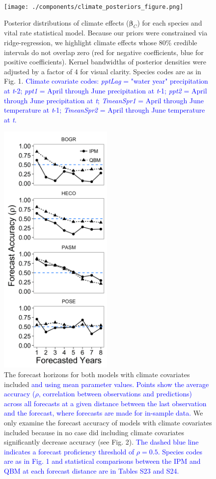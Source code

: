 \documentclass[12pt,]{article}
\begin{document}
\begin{figure}[!ht]
  \centering
      \texttt{[image: ./components/climate\_posteriors\_figure.png]}
  \caption{Posterior distributions of climate effects ($\boldsymbol{\beta}_C$) for each species and vital rate statistical model. Because our priors were constrained via ridge-regression, we highlight climate effects whose 80\% credible intervals do not overlap zero (red for negative coefficients, blue for positive coefficients). Kernel bandwidths of posterior densities were adjusted by a factor of 4 for visual clarity. Species codes are as in Fig. 1. \textcolor{blue}{Climate covariate codes: \emph{pptLag} = "water year" precipitation at \emph{t}-2; \emph{ppt1} = April through June precipitation at \emph{t}-1; \emph{ppt2} = April through June precipitation at \emph{t}; \emph{TmeanSpr1} = April through June temperature at \emph{t}-1; \emph{TmeanSpr2} = April through June temperature at \emph{t}.}}
\end{figure}

\newpage{}

\begin{figure}[!ht]
  \centering
      \includegraphics[height=5in]{./components/forecast_horizon.png}
  \caption{The forecast horizons for both models with climate covariates included \textcolor{blue}{and using mean parameter values. Points show the average accuracy ($\rho$, \textcolor{blue}{correlation between observations and predictions}) across all forecasts at a given distance between the last observation and the forecast, where forecasts are made for in-sample data.} We only examine the forecast accuracy of models with climate covariates included because in no case did including climate covariates significantly decrease accuracy (see Fig. 2). \textcolor{blue}{The dashed blue line indicates a forecast proficiency threshold of $\rho = 0.5$. Species codes are as in Fig. 1 and statistical comparisons between the IPM and QBM at each forecast distance are in Tables S23 and S24.}}
\end{figure}
\end{document}

